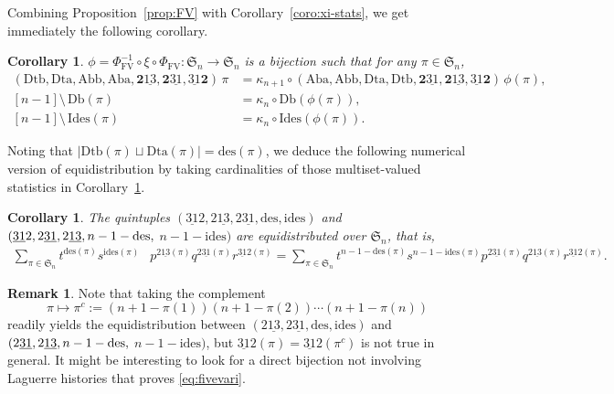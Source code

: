 \documentclass[12pt]{amsart}
\numberwithin{equation}{section}
\theoremstyle{plain}
\newtheorem{corollary}[theorem]{Corollary}
\theoremstyle{definition}
\newtheorem{remark}[theorem]{Remark}
\def\FV{\mathrm{FV}}
\def\SS{\mathfrak{S}}
\def\des{\mathrm{des}}
\def\ides{\mathrm{ides}}
\def\Db{\mathrm{Db}}
\def\Id{\mathrm{Ides}}
\def\Dtb{\mathrm{Dtb}}
\def\Dta{\mathrm{Dta}}
\def\Abb{\mathrm{Abb}}
\def\Aba{\mathrm{Aba}}
\def\pprs{\mathrm{2\underline{13}}}
\def\ppwrs{\mathrm{2\underline{31}}}
\def\pp31-2{\mathrm{\underline{31}2}}
\def\rightascent{{\mathbf{2}\underline{13}}}
\def\leftdescent{\mathrm{\underline{31}}\mathbf{2}}
\def\rightdescent{\mathrm{\mathbf{2}\underline{31}}}
\begin{document}
Combining Proposition~\ref{prop:FV} with Corollary~\ref{coro:xi-stats}, we get immediately the following corollary.

\begin{corollary}\label{coro:desbased}
$\phi=\Phi_{\FV}^{-1}\circ \xi \circ \Phi_{\FV}:\SS_n\to\SS_n$ is a bijection such that for any $\pi \in \SS_n$,
\begin{align*}
  (\Dtb,\Dta,\Abb,\Aba,\rightascent,\rightdescent,\leftdescent) \, \pi
&=\kappa_{n+1}\circ(\Aba,\Abb,\Dta,\Dtb,\rightdescent,\rightascent,\leftdescent) \, \phi(\pi),\\[4pt]
[n-1] \setminus\,  \Db(\pi) &=  \kappa_n\circ\Db(\phi(\pi)),\\[4pt]
  [n-1] \setminus\,  \Id(\pi) &=  \kappa_n\circ\Id(\phi(\pi)).
 

\end{align*}
\end{corollary}

Noting that $|\Dtb(\pi)\sqcup\Dta(\pi)|=\des(\pi)$, we deduce the following numerical version of equidistribution by taking cardinalities of those multiset-valued statistics in Corollary~\ref{coro:desbased}.
\begin{corollary}
The quintuples $(\pp31-2,\pprs,\ppwrs,\des,\ides)$ and $(\pp31-2,\ppwrs,\pprs,n-1-\des,\linebreak$
$n-1-\ides)$ are equidistributed over $\SS_n$, that is,
\begin{align}
\label{eq:fivevari}
\sum_{\pi \in \SS_n} t^{\des(\pi)} s^{\ides(\pi)}& p^{\pprs(\pi)} q^{\ppwrs(\pi)} r^{\pp31-2(\pi)}=\sum_{\pi \in \SS_n} t^{n-1-\des(\pi)} s^{n-1-\ides(\pi)} p^{\ppwrs(\pi)} q^{\pprs(\pi)} r^{\pp31-2(\pi)}.
\end{align}
\end{corollary}
\begin{remark}
Note that taking the complement $$\pi\mapsto\pi^{c}:=(n+1-\pi(1))(n+1-\pi(2))\cdots(n+1-\pi(n))$$ readily yields the equidistribution between $(\pprs,\ppwrs,\des,\ides)$ and $(\ppwrs,\pprs,n-1-\des,\linebreak$
$n-1-\ides)$, but $\pp31-2(\pi)=\pp31-2(\pi^c)$ is not true in general. It might be interesting to look for a direct bijection not involving Laguerre histories that proves \eqref{eq:fivevari}.
\end{remark}
\end{document}
